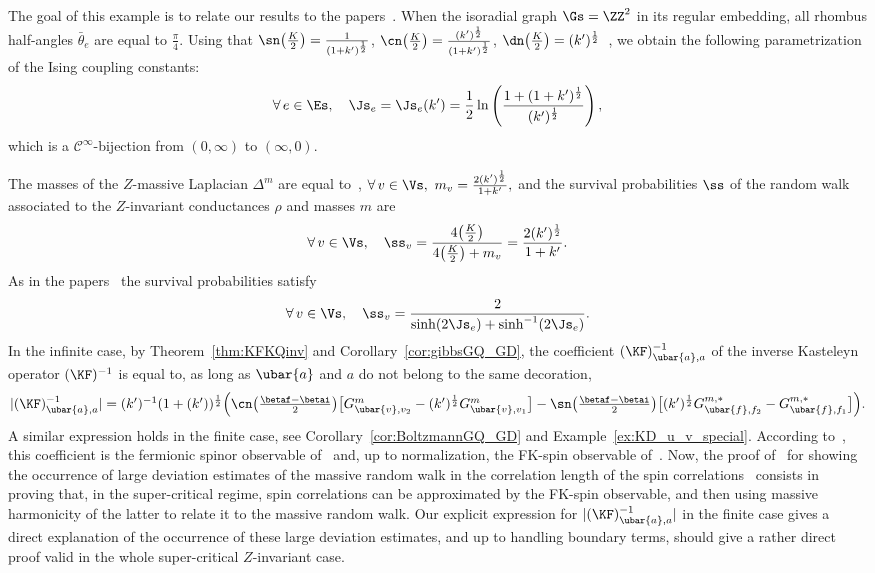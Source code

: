 \documentclass[a4paper,twoside,11pt]{article}
\begin{document}
The goal of this example is to relate our results to the papers~\cite{Messikh,BeffaraDuminil}.
When the isoradial graph $\Gs=\ZZ^2$ in its regular embedding, all rhombus half-angles $\bar{\theta}_e$ are equal to $\frac{\pi}{4}$. Using that 
$\sn\bigl(\frac{K}{2}\bigr)=\frac{1}{(1+k')^{\frac{1}{2}}}$, $\cn\bigl(\frac{K}{2}\bigr)=\frac{(k')^{\frac{1}{2}}}{(1+k')^{\frac{1}{2}}}$,
$\dn\bigl(\frac{K}{2}\bigr)=(k')^{\frac{1}{2}}$~\cite[16.5.2]{AS}, we obtain the following parametrization of the Ising coupling constants:
\[
\forall\,e\in\Es,\quad \Js_e=\Js_e(k')=\frac{1}{2}\ln\left(\frac{1+(1+k')^{\frac{1}{2}}}{(k')^{\frac{1}{2}}}\right),
\]
which is a $\mathcal{C}^\infty$-bijection from $(0,\infty)$ to $(\infty,0)$. 

The masses of the $Z$-massive Laplacian $\Delta^m$ are equal to~\cite{BdTR1},
$
\forall\,v\in \Vs,\ m_v=\frac{2(k')^{\frac{1}{2}}}{1+k'},
$
and the survival probabilities $\ss$ of the random walk associated to the $Z$-invariant conductances $\rho$ and masses $m$ are
\[
\forall\, v\in\Vs,\quad \ss_v=\frac{4\sc\bigl(\frac{K}{2}\bigr)}{4\sc\bigl(\frac{K}{2}\bigr)+m_v}=\frac{2(k')^{\frac{1}{2}}}{1+k'}.
\]
As in the papers~\cite{Messikh,BeffaraDuminil} the survival probabilities satisfy
\[
\forall\, v\in\Vs, \quad \ss_v=\frac{2}{\sinh(2\Js_e)+\sinh^{-1}(2\Js_e)}.
\]
In the infinite case, by Theorem~\ref{thm:KFKQinv} and Corollary~\ref{cor:gibbsGQ_GD}, the coefficient $(\KF)^{-1}_{\ubar{a},a}$ of the inverse Kasteleyn operator $(\KF)^{-1}$ is equal to, as long as $\ubar{a}$ and $a$
do not belong to the same decoration, 
\[\textstyle 
|(\KF)^{-1}_{\ubar{a},a}|=(k')^{-1}(1+(k'))^{\frac{1}{2}}
\Bigl(\cn\bigl(\frac{\betaf-\betai}{2}\bigr)\bigl[
G^m_{\ubar{v},v_2}-(k')^{\frac{1}{2}}G^m_{\ubar{v},v_1}\bigr]
-\sn\bigl(\frac{\betaf-\betai}{2}\bigr)
\bigl[(k')^{\frac{1}{2}}G^{m,*}_{\ubar{f},f_2}-G^{m,*}_{\ubar{f},f_1}\bigr]\Bigr).
\]
A similar expression holds in the finite case, see Corollary~\ref{cor:BoltzmannGQ_GD} and Example~\ref{ex:KD_u_v_special}. According 
to~\cite{Dubedat,NK}, this coefficient is the fermionic spinor observable of~\cite{KadanoffCeva} and, up to normalization, the FK-spin observable 
of~\cite{Smirnov2,ChelkakSmirnov:ising}. Now, the proof of~\cite{BeffaraDuminil} for showing the occurrence of 
large deviation estimates of the massive random walk in the correlation length of the spin correlations~\cite{Messikh} consists in proving that, in the super-critical 
regime, spin correlations can be approximated by the FK-spin observable, and then using massive harmonicity of the latter to relate it to the massive
random walk. Our explicit expression for $|(\KF)^{-1}_{\ubar{a},a}|$ in the finite case gives
a direct explanation of the occurrence of these large deviation estimates, and up to handling boundary terms, should give a rather direct proof valid in the whole 
super-critical $Z$-invariant case. 
\end{document}
